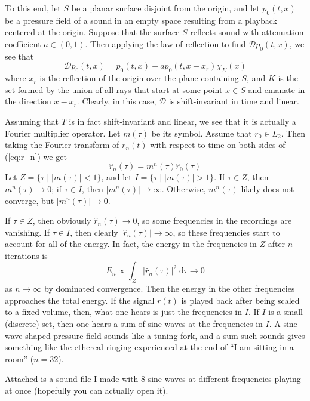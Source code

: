\documentclass{homework}
\begin{document}
   	 To this end, let \(S\) be a planar surface disjoint from the origin, and let \(p_0(t,x)\) be a pressure field of a sound in an empty space resulting from a playback centered at the origin. Suppose that the surface \(S\) reflects sound with attenuation coefficient \(a \in (0,1)\). Then applying the law of reflection to find \(\mathcal{D}p_0(t,x)\), we see that
   	 \begin{equation*}
   	 	\mathcal{D}p_0(t,x) = p_0(t,x) + ap_0(t, x-x_r)\chi_K(x)
   	 \end{equation*}
     where \(x_r\) is the reflection of the origin over the plane containing \(S\), and \(K\) is the set formed by the union of all rays that start at some point \(x\in S\) and emanate in the direction \(x-x_r\). Clearly, in this case, \(\mathcal{D}\) is shift-invariant in time and linear.
     
     Assuming that \(T\) is in fact shift-invariant and linear, we see that it is actually a Fourier multiplier operator. Let \(m(\tau)\) be its symbol. Assume that \(r_0 \in L_2\). Then taking the Fourier transform of \(r_n(t)\) with respect to time on both sides of (\ref{eq:r_n}) we get
     \begin{equation*}
     	\widehat{r}_n(\tau) = m^n(\tau)\widehat{r}_0(\tau)
     \end{equation*}
 	 Let \(Z = \{\tau \mid |m(\tau)| < 1\}\), and let \(I = \{\tau \mid |m(\tau)|>1\}\). If \(\tau \in Z\), then \(m^n(\tau)\to 0\); if \(\tau \in I\), then \(|m^n(\tau)| \to \infty\). Otherwise, \(m^n(\tau)\) likely does not converge, but \(|m^n(\tau)|\to 0\).
  	 
  	 If \(\tau \in Z\), then obviously \(\widehat{r}_n(\tau) \to 0\), so some frequencies in the recordings are vanishing. If \(\tau \in I\), then clearly \(\left|\widehat{r}_n(\tau)\right|\to \infty\), so these frequencies start to account for all of the energy. In fact, the energy in the frequencies in \(Z\) after \(n\) iterations is
  	 \begin{equation*}
  	 	E_n \propto \int_{Z}|\widehat{r}_n(\tau)|^2\;\text{d}\tau \to 0
  	 \end{equation*}
   	 as \(n\to\infty\) by dominated convergence. Then the energy in the other frequencies approaches the total energy. If the signal \(r(t)\) is played back after being scaled to a fixed volume, then, what one hears is just the frequencies in \(I\). If \(I\) is a small (discrete) set, then one hears a sum of sine-waves at the frequencies in \(I\). A sine-wave shaped pressure field sounds like a tuning-fork, and a sum such sounds gives something like the ethereal ringing experienced at the end of ``I am sitting in a room'' (\(n=32\)).
   	 
   	 Attached is a sound file I made with 8 sine-waves at different frequencies playing at once (hopefully you can actually open it).
\end{document}
